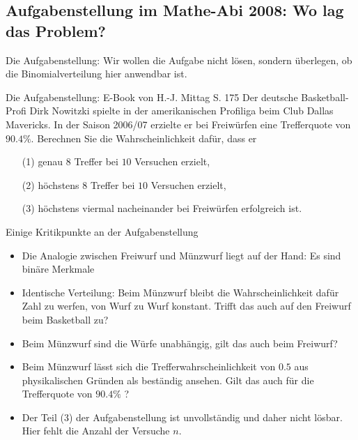 \documentclass[usenames,dvipsnames,handout]{beamer}
\begin{document}
\subsection{Aufgabenstellung im Mathe-Abi 2008: Wo lag das Problem?}
\begin{frame}{Die Aufgabenstellung: }%
Wir wollen die Aufgabe nicht lösen, sondern überlegen, ob die Binomialverteilung hier anwendbar ist.\\ \pause
\begin{block}{Die Aufgabenstellung: E-Book von H.-J. Mittag S. 175}
Der deutsche Basketball-Profi Dirk Nowitzki spielte in der amerikanischen Profiliga beim Club Dallas Mavericks. In der Saison 2006/07
erzielte er bei Freiwürfen eine Trefferquote von $90.4\%.$ Berechnen Sie die Wahrscheinlichkeit dafür, dass er
\begin{itemize}
\item[(1)]{genau $8$ Treffer bei $10$ Versuchen erzielt,}
\item[(2)]{höchstens $8$ Treffer bei $10$ Versuchen erzielt,}
\item[(3)]{höchstens viermal nacheinander bei Freiwürfen erfolgreich ist.}
\end{itemize}
\end{block}
\end{frame}

\begin{frame}{Einige Kritikpunkte an der Aufgabenstellung}
\begin{itemize}

\item{Die Analogie zwischen Freiwurf und Münzwurf liegt auf der Hand: Es sind binäre Merkmale}\pause
\item{Identische Verteilung: Beim Münzwurf bleibt die Wahrscheinlichkeit dafür Zahl zu werfen, von Wurf zu Wurf konstant. Trifft das auch
auf den Freiwurf beim Basketball zu?}\pause
\item{Beim Münzwurf sind die Würfe unabhängig, gilt das auch beim Freiwurf?}\pause
\item{Beim Münzwurf lässt sich die Trefferwahrscheinlichkeit von $0.5$ aus physikalischen Gründen als beständig ansehen.
Gilt das auch für die Trefferquote von $90.4\%$ ?}
\item{Der Teil (3) der Aufgabenstellung ist unvollständig und daher \colorbox{yellow!20}{nicht lösbar.} Hier fehlt die Anzahl der
Versuche $n.$}
\end{itemize}

\end{frame}
\end{document}
